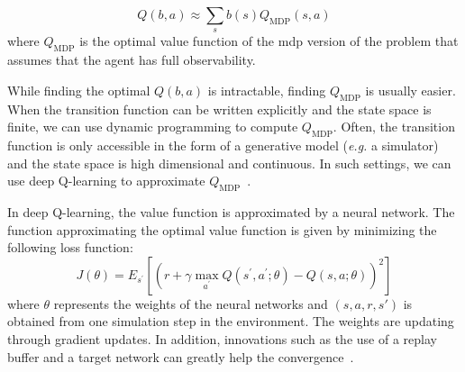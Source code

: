 \begin{equation}
    Q(b, a) \approx \sum_s b(s) Q_{\mathrm{MDP}}(s, a)
    \label{eq:qmdp}
\end{equation}
where $Q_{\mathrm{MDP}}$ is the optimal value function of the \gls{mdp} version of the problem that assumes that the agent has full observability. 

While finding the optimal $Q(b, a)$ is intractable, finding $Q_{\mathrm{MDP}}$ is usually easier. 
When the transition function can be written explicitly and the state space is finite, we can use dynamic programming to compute $Q_{\mathrm{MDP}}$. 
Often, the transition function is only accessible in the form of a generative model (\textit{e.g.} a simulator) and the state space is high dimensional and continuous. 
In such settings, we can use deep Q-learning to approximate $Q_{\mathrm{MDP}}$~\cite{LITTMAN1995}. 

In deep Q-learning, the value function is approximated by a neural network. The function approximating the optimal value function is given by minimizing the following loss function:
\begin{equation}
    J(\theta) = E_{s^\prime}[(r + \gamma \max_{a^\prime}Q(s^\prime, a^\prime; \theta) - Q(s, a; \theta))^2]
    \label{eq:dqn-loss}
\end{equation}
where $\theta$ represents the weights of the neural networks and $(s, a, r, s')$ is obtained from one simulation step in the environment. 
The weights are updating through gradient updates. 
In addition, innovations such as the use of a replay buffer and a target network can greatly help the convergence~\cite{Mnih2015}. 

